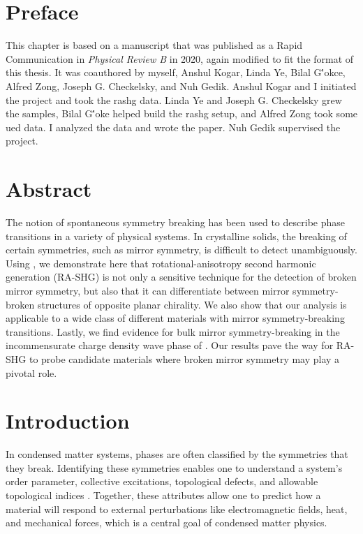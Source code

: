 \section{Preface}

This chapter is based on a manuscript that was published as a Rapid Communication in \textit{Physical Review B} in 2020, again modified to fit the format of this thesis.
It was coauthored by myself, Anshul Kogar, Linda Ye, Bilal G\''okce, Alfred Zong, Joseph G. Checkelsky, and Nuh Gedik.
Anshul Kogar and I initiated the project and took the \gls{rashg} data.
Linda Ye and Joseph G. Checkelsky grew the samples, Bilal G\''oke helped build the \gls{rashg} setup, and Alfred Zong took some \gls{ued} data.
I analyzed the data and wrote the paper.
Nuh Gedik supervised the project.

\section{Abstract}

The notion of spontaneous symmetry breaking has been used to describe phase transitions in a variety of physical systems.
In crystalline solids, the breaking of certain symmetries, such as mirror symmetry, is difficult to detect unambiguously.
Using \tastwo, we demonstrate here that rotational-anisotropy second harmonic generation (RA-SHG) is not only a sensitive technique for the detection of broken mirror symmetry, but also that it can differentiate between mirror symmetry-broken structures of opposite planar chirality.
We also show that our analysis is applicable to a wide class of different materials with mirror symmetry-breaking transitions.
Lastly, we find evidence for bulk mirror symmetry-breaking in the incommensurate charge density wave phase of \tastwo.
Our results pave the way for RA-SHG to probe candidate materials where broken mirror symmetry may play a pivotal role.

\section{Introduction}

In condensed matter systems, phases are often classified by the symmetries that they break.
Identifying these symmetries enables one to understand a system's order parameter, collective excitations, topological defects, and allowable topological indices \cite{sethna, thouless}.
Together, these attributes allow one to predict how a material will respond to external perturbations like electromagnetic fields, heat, and mechanical forces, which is a central goal of condensed matter physics.

